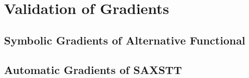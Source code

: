 \chapter{Validation of Gradients}


\section{Symbolic Gradients of Alternative Functional}

\section{Automatic Gradients of SAXSTT}

